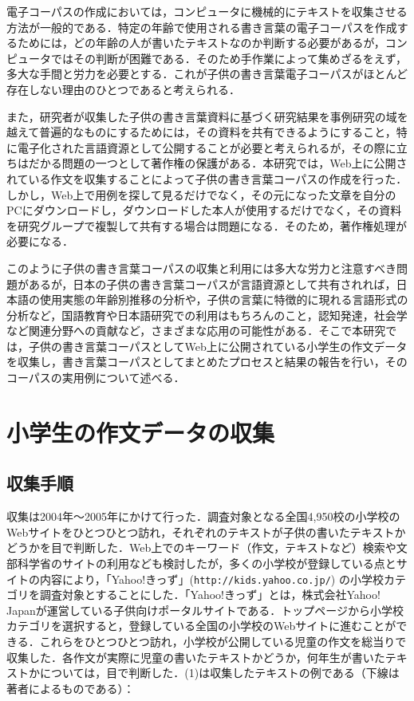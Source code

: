 \documentclass[japanese]{jnlp_1.4}
\begin{document}
電子コーパスの作成においては，コンピュータに機械的にテキストを収集させる方法が一般的である．特定の年齢で使用される書き言葉の電子コーパスを作成するためには，どの年齢の人が書いたテキストなのか判断する必要があるが，コンピュータではその判断が困難である．そのため手作業によって集めざるをえず，多大な手間と労力を必要とする．これが子供の書き言葉電子コーパスがほとんど存在しない理由のひとつであると考えられる．

また，研究者が収集した子供の書き言葉資料に基づく研究結果を事例研究の域を越えて普遍的なものにするためには，その資料を共有できるようにすること，特に電子化された言語資源として公開することが必要と考えられるが，その際に立ちはだかる問題の一つとして著作権の保護がある．本研究では，Web上に公開されている作文を収集することによって子供の書き言葉コーパスの作成を行った．しかし，Web上で用例を探して見るだけでなく，その元になった文章を自分のPCにダウンロードし，ダウンロードした本人が使用するだけでなく，その資料を研究グループで複製して共有する場合は問題になる．そのため，著作権処理が必要になる．

このように子供の書き言葉コーパスの収集と利用には多大な労力と注意すべき問題があるが，日本の子供の書き言葉コーパスが言語資源として共有されれば，日本語の使用実態の年齢別推移の分析や，子供の言葉に特徴的に現れる言語形式の分析など，国語教育や日本語研究での利用はもちろんのこと，認知発達，社会学など関連分野への貢献など，さまざまな応用の可能性がある．そこで本研究では，子供の書き言葉コーパスとしてWeb上に公開されている小学生の作文データを収集し，書き言葉コーパスとしてまとめたプロセスと結果の報告を行い，そのコーパスの実用例について述べる．


\section{小学生の作文データの収集}
\vspace{-0.5\baselineskip}

\subsection{収集手順}

収集は2004年〜2005年にかけて行った．調査対象となる全国4,950校の小学校のWebサイトをひとつひとつ訪れ，それぞれのテキストが子供の書いたテキストかどうかを目で判断した．Web上でのキーワード（作文，テキストなど）検索や文部科学省のサイトの利用なども検討したが，多くの小学校が登録している点とサイトの内容により，「Yahoo!きっず」(\texttt{http://kids.yahoo.co.jp/}) の小学校カテゴリを調査対象とすることにした．「Yahoo!きっず」とは，株式会社Yahoo! Japanが運営している子供向けポータルサイトである．トップページから小学校カテゴリを選択すると，登録している全国の小学校のWebサイトに進むことができる．これらをひとつひとつ訪れ，小学校が公開している児童の作文を総当りで収集した．各作文が実際に児童の書いたテキストかどうか，何年生が書いたテキストかについては，目で判断した．(1)は収集したテキストの例である（下線は著者によるものである）：
\vspace{0.5\baselineskip}
\end{document}
